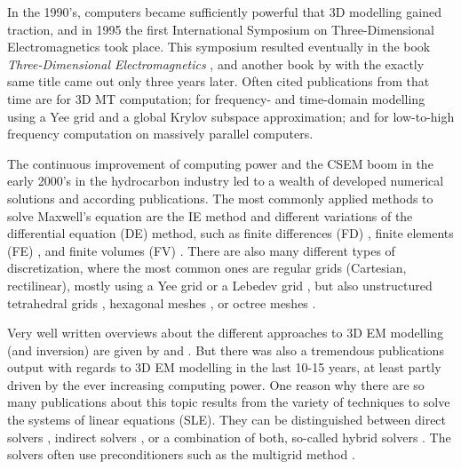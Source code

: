 \documentclass[
    paper,
  ]{geophysics}
\begin{document}
In the 1990's, computers became sufficiently powerful that 3D modelling gained traction, and in 1995 the first International Symposium on Three-Dimensional Electromagnetics took place. This symposium resulted eventually in the book \emph{Three-Dimensional Electromagnetics} \citep{B.SEG.99.Oristaglio}, and another book by \cite{B.02.Wannamaker} with the exactly same title came out only three years later. Often cited publications from that time are \cite{RSC.94.Mackie} for 3D MT computation; \cite{RS.94.Druskin} for frequency- and time-domain modelling using a Yee grid and a global Krylov subspace approximation; and \cite{RS.96.Alumbaugh, GJI.97.Newman} for low-to-high frequency computation on massively parallel computers.

The continuous improvement of computing power and the CSEM boom in the early 2000's in the hydrocarbon industry led to a wealth of developed numerical solutions and according publications. The most commonly applied methods to solve Maxwell's equation are the IE method \citep{GJI.74.Raiche, RS.02.Hursan, GEO.06.Zhdanov, GP.10.Tehrani, CAG.16.Kruglyakov, MGS.17.Kruglyakov} and different variations of the differential equation (DE) method, such as finite differences (FD) \citep{GEO.93.Wang, RS.94.Druskin, RSC.94.Mackie, GEO.09.Streich, CAG.13.Sommer}, finite elements (FE) \citep{GEO.04.Commer, GJI.11.Schwarzbach,GEO.12.daSilva, GJI.13.Grayver, GJI.13.Puzyrev, SEG.16.Zhang}, and finite volumes (FV) \citep{EM.90.Madsen, SIAM.01.Haber, PIER.01.Clemens, GEO.14.Jahandari}. There are also many different types of discretization, where the most common ones are regular grids (Cartesian, rectilinear), mostly using a Yee grid \citep{IEEE.66.Yee} or a Lebedev grid \citep{CMMP.64.Lebedev}, but also unstructured tetrahedral grids \citep{SEG.16.Zhang, CAG.17.Cai}, hexagonal meshes \citep{CAG.14.Cai}, or octree meshes \citep{ECP.07.Haber}.

Very well written overviews about the different approaches to 3D EM modelling (and inversion) are given by \cite{SG.05.Avdeev} and \cite{SG.10.Borner}. But there was also a tremendous publications output with regards to 3D EM modelling in the last 10-15 years, at least partly driven by the ever increasing computing power. One reason why there are so many publications about this topic results from the variety of techniques to solve the systems of linear equations (SLE). They can be distinguished between direct solvers \citep{GEO.09.Streich, GP.14.Chung, GEO.14.Jaysaval, GEO.15.Grayver, SEG.15.Oh, GJI.18.Wang}, indirect solvers \citep{GP.06.Mulder, GJI.15.Jaysaval}, or a combination of both, so-called hybrid solvers \citep{GEO.18.Liu}. The solvers often use preconditioners such as the multigrid method \citep{SIAM.02.Aruliah, GJI.16.Jaysaval}.
\end{document}
